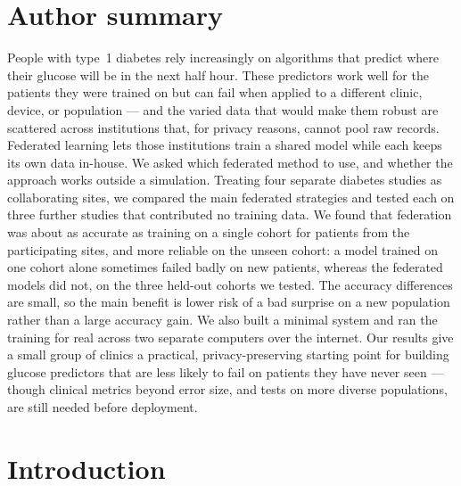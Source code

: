 \documentclass[10pt,letterpaper]{article}
\begin{document}
\section*{Author summary}
People with type~1 diabetes rely increasingly on algorithms that predict where
their glucose will be in the next half hour. These predictors work well for the
patients they were trained on but can fail when applied to a different clinic,
device, or population --- and the varied data that would make them robust are
scattered across institutions that, for privacy reasons, cannot pool raw
records. Federated learning lets those institutions train a shared model while
each keeps its own data in-house. We asked which federated method to use, and
whether the approach works outside a simulation. Treating four separate
diabetes studies as collaborating sites, we compared the main federated
strategies and tested each on three further studies that contributed no training
data.
We found that federation was about as accurate as training on a single cohort
for patients from the participating sites, and more reliable on the unseen
cohort: a model trained on one cohort alone sometimes failed badly on new
patients, whereas the federated models did not, on the three held-out cohorts we
tested. The accuracy differences are
small, so the main benefit is lower risk of a bad surprise on a new population
rather than a large accuracy gain. We also built a minimal system and ran the
training for real across two separate computers over the internet. Our results
give a small group of clinics a practical, privacy-preserving starting point for
building glucose predictors that are less likely to fail on patients they have
never seen --- though clinical metrics beyond error size, and tests on more
diverse populations, are still needed before deployment.

\clearpage
{}
\linenumbers

\section*{Introduction}
\end{document}
